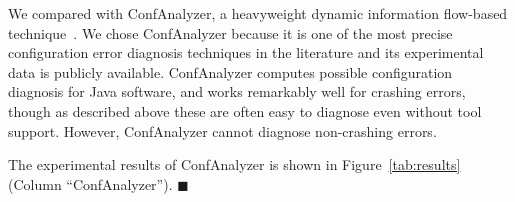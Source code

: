 We compared \ourtool with ConfAnalyzer, a heavyweight dynamic information
flow-based technique~\cite{Rabkin:2011:PPC}.
We chose ConfAnalyzer because it is one of the most precise configuration
error diagnosis techniques in the literature and its 
experimental data is publicly available.
ConfAnalyzer computes possible configuration diagnosis for Java software,
and works remarkably well for crashing errors, though as
described above these are often easy to diagnose even without tool
support. However, ConfAnalyzer cannot diagnose non-crashing errors.

The experimental results of ConfAnalyzer is shown in Figure~\ref{tab:results} (Column ``ConfAnalyzer'').
$\blacksquare$




